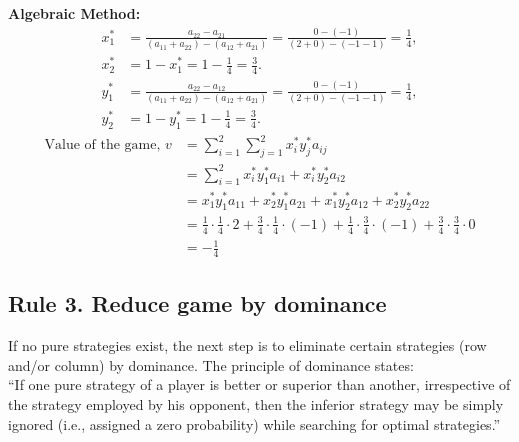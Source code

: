 \documentclass[../main-sheet.tex]{subfiles}
\begin{document}
\begin{soln}
        \textbf{Algebraic Method:}
        \begin{align*}
            x_1^{*}&=\frac{a_{22}-a_{21}}{\left( a_{11}+a_{22} \right)-\left( a_{12}+a_{21} \right)}=\frac{0-(-1)}{\left( 2+0 \right)-\left( -1-1 \right)}=\frac{1}{4},\\
            x_2^{*}&=1-x_1^{*}=1-\frac{1}{4}=\frac{3}{4}.\\
            y_1^{*}&=\frac{a_{22}-a_{12}}{\left( a_{11}+a_{22} \right)-\left( a_{12}+a_{21} \right)}=\frac{0-(-1)}{\left( 2+0 \right)-\left( -1-1 \right)}=\frac{1}{4},\\
            y_2^{*}&=1-y_1^{*}=1-\frac{1}{4}=\frac{3}{4}.
        \end{align*}
        \begin{align*}
            \text{Value of the game, } v&=\sum_{i=1}^2\sum_{j=1}^2 x_i^{*}y_j^{*}a_{ij}\\
            &=\sum_{i=1}^2 x_i^{*}y_1^{*}a_{i1}+x_i^{*}y_2^{*}a_{i2}\\
            &= x_1^{*}y_1^{*}a_{11}+x_2^{*}y_1^{*}a_{21}+x_1^{*}y_2^{*}a_{12}+x_2^{*}y_2^{*}a_{22}\\
            &=\frac{1}{4}\cdot\frac{1}{4}\cdot2+\frac{3}{4}\cdot\frac{1}{4}\cdot(-1)+\frac{1}{4}\cdot\frac{3}{4}\cdot(-1)+\frac{3}{4}\cdot\frac{3}{4}\cdot 0\\
            &=-\frac{1}{4}
        \end{align*}
    \end{soln}
    \subsection{Rule 3. Reduce game by dominance}
    If no pure strategies exist, the next step is to eliminate certain strategies (row and/or column) by dominance. The principle of dominance states:\\
    ``If one pure strategy of a player is better or superior than another, irrespective of the strategy employed by his opponent, then the inferior strategy may be simply ignored (i.e., assigned a zero probability) while searching for optimal strategies.''\\
\end{document}
